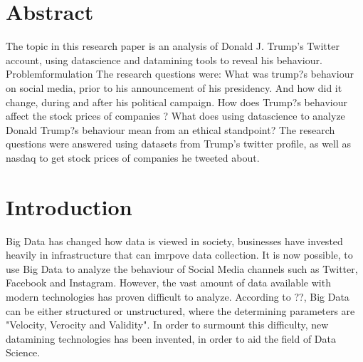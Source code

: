 \documentclass[11pt]{article}
\begin{document}
\color{NavyBlue} \tableofcontents \color{black}
\thispagestyle{empty} %
 \cleardoublepage
\setcounter{page}{1}%


\cleardoublepage%


\section{Abstract} %
The topic in this research paper is an analysis of Donald J. Trump's Twitter account, using datascience and datamining tools to reveal his behaviour.
Problemformulation
The research questions were:
 What was trump?s behaviour on social media, prior to his announcement of his presidency. And how did it change, during and after his political campaign.  
 How does Trump?s behaviour affect the stock prices of companies ?
 What does using datascience to analyze Donald Trump?s behaviour mean from an ethical standpoint?
 The research questions were answered using datasets from Trump's twitter profile, as well as nasdaq to get stock prices of companies he tweeted about.
 

\cleardoublepage %



















\color{NavyBlue} \section{Introduction} \label{sec:intro}

\color {black}

Big Data has changed how data is viewed in society, businesses have  invested heavily in infrastructure that can imrpove data collection.
It is now possible, to use Big Data to analyze the behaviour of Social Media channels such as Twitter, Facebook and Instagram. 
However, the vast amount of data available with modern technologies has proven difficult to analyze. According to ??, Big Data can be either
structured or unstructured, where the determining parameters are "Velocity, Verocity and Validity". In order to surmount  this difficulty, new datamining technologies 
has been invented, in order to aid the field of Data Science. \\
\end{document}
